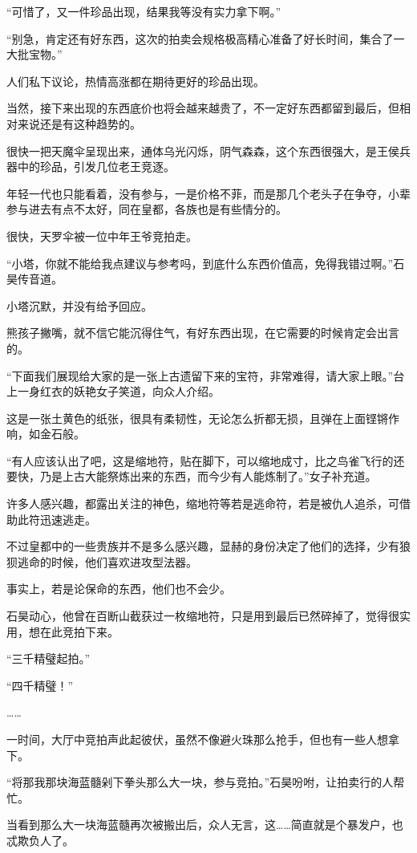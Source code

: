 “可惜了，又一件珍品出现，结果我等没有实力拿下啊。”

“别急，肯定还有好东西，这次的拍卖会规格极高精心准备了好长时间，集合了一大批宝物。”

人们私下议论，热情高涨都在期待更好的珍品出现。

当然，接下来出现的东西底价也将会越来越贵了，不一定好东西都留到最后，但相对来说还是有这种趋势的。

很快一把天魔伞呈现出来，通体乌光闪烁，阴气森森，这个东西很强大，是王侯兵器中的珍品，引发几位老王竞逐。

年轻一代也只能看着，没有参与，一是价格不菲，而是那几个老头子在争夺，小辈参与进去有点不太好，同在皇都，各族也是有些情分的。

很快，天罗伞被一位中年王爷竞拍走。

“小塔，你就不能给我点建议与参考吗，到底什么东西价值高，免得我错过啊。”石昊传音道。

小塔沉默，并没有给予回应。

熊孩子撇嘴，就不信它能沉得住气，有好东西出现，在它需要的时候肯定会出言的。

“下面我们展现给大家的是一张上古遗留下来的宝符，非常难得，请大家上眼。”台上一身红衣的妖艳女子笑道，向众人介绍。

这是一张土黄色的纸张，很具有柔韧性，无论怎么折都无损，且弹在上面铿锵作响，如金石般。

“有人应该认出了吧，这是缩地符，贴在脚下，可以缩地成寸，比之鸟雀飞行的还要快，乃是上古大能祭炼出来的东西，而今少有人能炼制了。”女子补充道。

许多人感兴趣，都露出关注的神色，缩地符等若是逃命符，若是被仇人追杀，可借助此符迅速逃走。

不过皇都中的一些贵族并不是多么感兴趣，显赫的身份决定了他们的选择，少有狼狈逃命的时候，他们喜欢进攻型法器。

事实上，若是论保命的东西，他们也不会少。

石昊动心，他曾在百断山截获过一枚缩地符，只是用到最后已然碎掉了，觉得很实用，想在此竞拍下来。

“三千精璧起拍。”

“四千精璧！”

……

一时间，大厅中竞拍声此起彼伏，虽然不像避火珠那么抢手，但也有一些人想拿下。

“将那我那块海蓝髓剁下拳头那么大一块，参与竞拍。”石昊吩咐，让拍卖行的人帮忙。

当看到那么大一块海蓝髓再次被搬出后，众人无言，这……简直就是个暴发户，也忒欺负人了。

